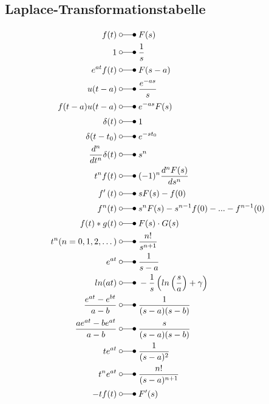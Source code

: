 \subsection{Laplace-Transformationstabelle}
\begin{align*}
    f(t)                            \;&\laplace\; F(s) \\
    1                               \;&\laplace\; \frac{1}{s} \\
    e^{at}f(t)                      \;&\laplace\; F(s-a) \\
    u(t-a)                          \;&\laplace\; \frac{e^{-as}}{s} \\
    f(t-a)u(t-a)                    \;&\laplace\; e^{-as}F(s) \\
    \delta(t)                       \;&\laplace\; 1\\
    \delta(t-t_{0})                 \;&\laplace\; e^{-st_{0}} \\
    \frac{d^{n}}{dt^{n}}\delta(t)   \;&\laplace\; s^{n}  \\
    t^{n}f(t)                       \;&\laplace\; (-1)^n \frac{d^nF(s)}{ds^n}  \\
    f^{\prime}\left(t\right)        \;&\laplace\; \begin{aligned}sF(s)-f(0)\end{aligned}  \\
    f^{n}(t)                        \;&\laplace\; s^nF(s)-s^{n-1}f(0)-...-f^{n-1}(0)  \\
    f(t)*g(t)                       \;&\laplace\; \begin{aligned}F(s)\cdot G(s)\end{aligned}  \\
    t^{n}(n=0,1,2,\dots)            \;&\laplace\; \frac{n!}{s^{n+1}}  \\
    e^{at}                          \;&\laplace\; \frac{1}{s-a}  \\
    ln(at)                          \;&\laplace\; -\frac{1}{s}\left(ln\left(\frac sa\right)+\gamma\right)  \\ 
    \frac{e^{at}-e^{bt}}{a-b}       \;&\laplace\; \frac{1}{(s-a)(s-b)} \\
    \frac{ae^{at}-be^{at}}{a-b}     \;&\laplace\; \frac{s}{(s-a)(s-b)} \\
    te^{at}                         \;&\laplace\; \frac{1}{(s-a)^2}  \\
    t^{n}e^{at}                     \;&\laplace\; \frac{n!}{(s-a)^{n+1}}  \\
    -tf(t)                          \;&\laplace\; F^{\prime}(s)  \\

\end{align*}
